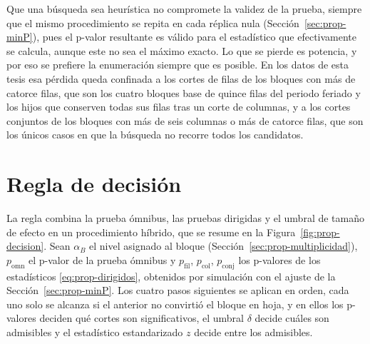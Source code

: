 Que una búsqueda sea heurística no compromete la validez de la prueba, siempre
que el mismo procedimiento se repita en cada réplica nula
(Sección~\ref{sec:prop-minP}), pues el p-valor resultante es válido para el
estadístico que efectivamente se calcula, aunque este no sea el máximo exacto.
Lo que se pierde es potencia, y por eso se prefiere la enumeración siempre que
es posible. En los datos de esta tesis esa pérdida queda confinada a los cortes
de filas de los bloques con más de catorce filas, que son los cuatro bloques base
de quince filas del periodo feriado y los hijos que conserven todas sus filas
tras un corte de columnas, y a los cortes conjuntos de los bloques con más de
seis columnas o más de catorce filas, que son los únicos casos en que la búsqueda no recorre todos los
candidatos.

\section{Regla de decisión}\label{sec:prop-decision}

La regla combina la prueba ómnibus, las pruebas dirigidas y el umbral de tamaño
de efecto en un procedimiento híbrido, que se resume en la
Figura~\ref{fig:prop-decision}. Sean $\alpha_B$ el nivel asignado al bloque
(Sección~\ref{sec:prop-multiplicidad}), $p_{\mathrm{omn}}$ el p-valor de la
prueba ómnibus y $p_{\mathrm{fil}}$, $p_{\mathrm{col}}$, $p_{\mathrm{conj}}$ los
p-valores de los estadísticos \eqref{eq:prop-dirigidos}, obtenidos por
simulación con el ajuste de la Sección~\ref{sec:prop-minP}. Los cuatro pasos
siguientes se aplican en orden, cada uno solo se alcanza si el anterior no
convirtió el bloque en hoja, y en ellos los p-valores deciden qué cortes son
significativos, el umbral $\delta$ decide cuáles son admisibles y el estadístico
estandarizado $z$ decide entre los admisibles.


